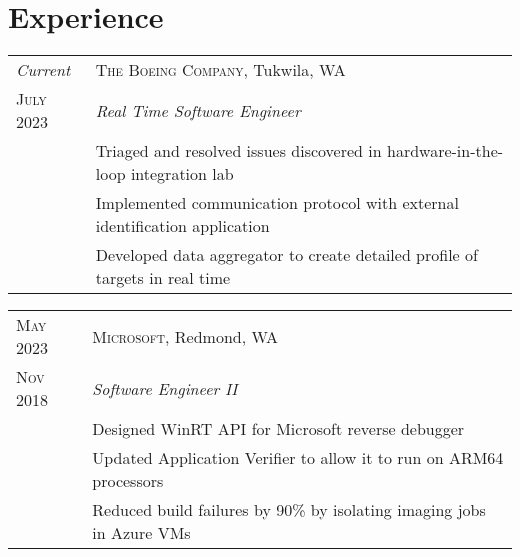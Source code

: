 \documentclass[a4paper,12pt]{article} %
\begin{document}
\pagestyle{empty} %


\par{\par}
\par{\par}

\vspace{10pt} %


\section{Experience}

\begin{tabular}{R{2.1cm}|L{13.0cm}}
\emph{Current} & \textsc{The Boeing Company}, Tukwila, WA \\
\textsc{July 2023} & \emph{Real Time Software Engineer} \\
& \footnotesize{Triaged and resolved issues discovered in hardware-in-the-loop integration lab} \\
& \footnotesize{Implemented communication protocol with external identification application} \\
& \footnotesize{Developed data aggregator to create detailed profile of targets in real time} \\

\end{tabular}


\begin{tabular}{R{2.1cm}|L{13.0cm}}
\textsc{May 2023} & \textsc{Microsoft}, Redmond, WA \\
\textsc{Nov 2018} & \emph{Software Engineer II} \\
& \footnotesize{Designed WinRT API for Microsoft reverse debugger} \\
& \footnotesize{Updated Application Verifier to allow it to run on ARM64 processors} \\
& \footnotesize{Reduced build failures by 90\% by isolating imaging jobs in
  Azure VMs} \\
\end{tabular}
\end{document}
